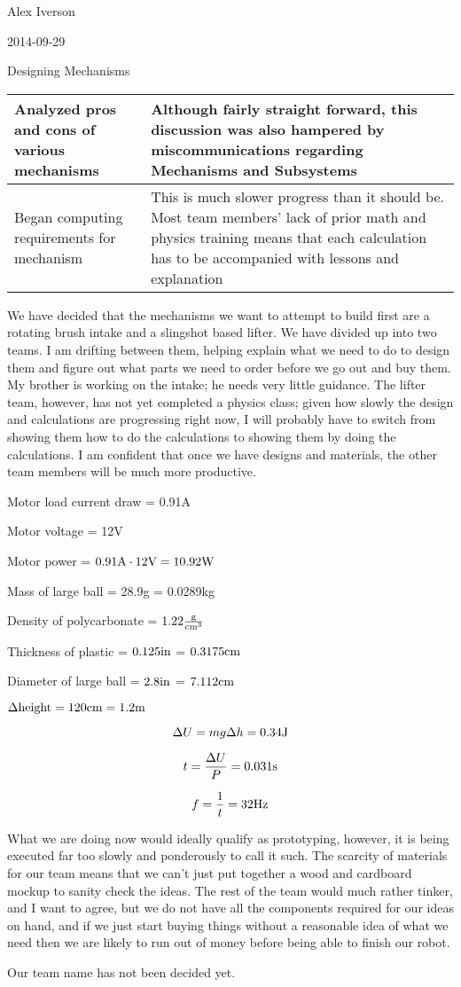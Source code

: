 Alex Iverson

2014-09-29

Designing Mechanisms

\begin{tabular}{|p{5cm}|p{5cm}|}
 \hline
 Analyzed pros and cons of various mechanisms
 &
 Although fairly straight forward, this discussion was also hampered by miscommunications regarding Mechanisms and Subsystems
 \\
 \hline
 Began computing requirements for mechanism
 &
 This is much slower progress than it should be. Most team members’ lack of prior math and physics training means that each calculation has to be accompanied with lessons and explanation
 \\
 \hline
\end{tabular}

We have decided that the mechanisms we want to attempt to build first are a rotating brush intake and a slingshot based lifter. We have divided up into two teams. I am drifting between them, helping explain what we need to do to design them and figure out what parts we need to order before we go out and buy them. My brother is working on the intake; he needs very little guidance. The lifter team, however, has not yet completed a physics class; given how slowly the design and calculations are progressing right now, I will probably have to switch from showing them how to do the calculations to showing them by doing the calculations. I am confident that once we have designs and materials, the other team members will be much more productive. 

Motor load current draw = 0.91A

Motor voltage = 12V

Motor power = $0.91\rm{A}\cdot12\rm{V} = 10.92\rm{W}$

Mass of large ball = 28.9g = 0.0289kg

Density of polycarbonate = $1.22\frac{\rm{g}}{\rm{cm}^3}$

Thickness of plastic = $0.125\rm{in}$ = $0.3175\rm{cm}$

Diameter of large ball = $2.8\rm{in}$ = $7.112\rm{cm}$

$\Delta \rm{height} = 120\rm{cm} = 1.2\rm{m}$

\[\Delta U = m g \Delta h = 0.34\rm{J}\]

\[t = \frac{\Delta U}{P} = 0.031\rm{s}\]

\[f = \frac{1}{t} = 32\rm{Hz}\]

\medskip

What we are doing now would ideally qualify as prototyping, however, it is being executed far too slowly and ponderously to call it such. The scarcity of materials for our team means that we can’t just put together a wood and cardboard mockup to sanity check the ideas. The rest of the team would much rather tinker, and I want to agree, but we do not have all the components required for our ideas on hand, and if we just start buying things without a reasonable idea of what we need then we are likely to run out of money before being able to finish our robot.

Our team name has not been decided yet.
